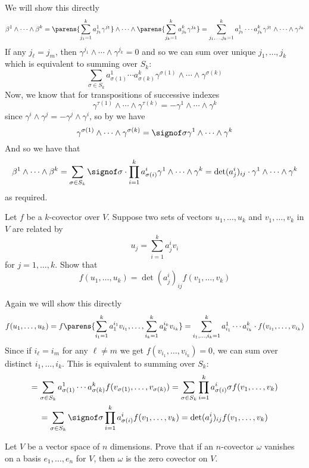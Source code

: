 \documentclass[10pt]{article}
\begin{document}
We will show this directly
\[ \beta^1\wedge\cdots\wedge\beta^k = \parens{\sum_{j_1=1}^k a^1_{j_1}\gamma^{j_1}}\wedge\cdots\wedge\parens{\sum_{j_k=1}^k a^k_{j_k}\gamma^{j_k}} =
\sum_{j_1,\dots,j_k=1}^k a^1_{j_1}\cdots a^k_{j_k}\gamma^{j_1}\wedge\cdots\wedge\gamma^{j_k} \]
If any $j_\ell=j_m$, then $\gamma^{j_1}\wedge\cdots\wedge\gamma^{j_k}=0$ and so we can sum over unique $j_1,\dots,j_k$ which is equivalent to summing over $S_k$:
\[ \sum_{\sigma\in S_k} a^1_{\sigma(1)}\cdots a^k_{\sigma(k)}\gamma^{\sigma(1)}\wedge\cdots\wedge\gamma^{\sigma(k)} \]
Now, we know that for transpositions of successive indexes
\[ \gamma^{\tau(1)}\wedge\cdots\wedge\gamma^{\tau(k)} = -\gamma^1\wedge\cdots\wedge\gamma^k \]
since $\gamma^i\wedge\gamma^j=-\gamma^j\wedge\gamma^i$, so by  we have
\[ \gamma^{\sigma(1)}\wedge\cdots\wedge\gamma^{\sigma(k)} = \signof\sigma\gamma^1\wedge\cdots\wedge\gamma^k \]
And so we have that
\[ \beta^1\wedge\cdots\wedge\beta^k = \sum_{\sigma\in S_k}\signof\sigma\cdot\prod_{i=1}^k a^i_{\sigma(i)}\gamma^1\wedge\cdots\wedge\gamma^k = \det(a^i_j)_{ij}\cdot\gamma^1\wedge\cdots\wedge\gamma^k \]
as required.

\begin{exercise*}

    Let $f$ be a $k$-covector over $V$.
    Suppose two sets of vectors $u_1,\dots,u_k$ and $v_1,\dots,v_k$ in $V$ are related by
    \[ u_j = \sum_{i=1}^ka^i_jv_i \]
    for $j=1,\dots,k$.
    Show that
    \[ f(u_1,\dots,u_k) = \det(a^i_j)_{ij} f(v_1,\dots,v_k) \]

\end{exercise*}

Again we will show this directly
\[ f(u_1,\dots,u_k) = f\parens{\sum_{i_1=1}^ka^{i_1}_1v_{i_1},\dots,\sum_{i_k=1}^ka^{i_k}_kv_{i_k}} = \sum_{i_1,\dots,i_k=1}^k a_{i_1}^1\cdots a_{i_k}^k\cdot f(v_{i_1},\dots,v_{i_k}) \]
Since if $i_\ell=i_m$ for any $\ell\neq m$ we get $f(v_{i_1},\dots,v_{i_k})=0$, we can sum over distinct $i_1,\dots,i_k$.
This is equivalent to summing over $S_k$:
\begin{multline*}
    = \sum_{\sigma\in S_k} a^1_{\sigma(1)}\cdots a^k_{\sigma(k)}f(v_{\sigma(1)},\dots,v_{\sigma(k)}) = \sum_{\sigma\in S_k}\prod_{i=1}^k a_{\sigma(i)}^i \sigma f(v_1,\dots,v_k) \\
    = \sum_{\sigma\in S_k}\signof\sigma\prod_{i=1}^k a_{\sigma(i)}^i f(v_1,\dots,v_k) = \det(a^i_j)_{ij}f(v_1,\dots,v_k)
\end{multline*}

\begin{exercise*}

    Let $V$ be a vector space of $n$ dimensions.
    Prove that if an $n$-covector $\omega$ vanishes on a basis $e_1,\dots,e_n$ for $V$, then $\omega$ is the zero covector on $V$.

\end{exercise*}
\end{document}
